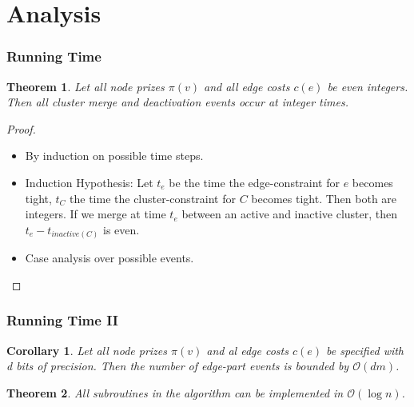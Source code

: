\documentclass[11pt]{beamer}
\newtheorem{theo}{Theorem}
\newtheorem{cor}{Corollary}
\begin{document}
\section{Analysis}

\begin{frame} 
	\frametitle{Running Time}
	\begin{theo}
		Let all node prizes $\pi(v)$ and all edge costs $c(e)$ be even integers. Then all cluster merge and deactivation events occur at integer times.
		\end{theo}
		\pause
		\begin{proof}
			\begin{itemize}
				\item By induction on possible time steps.
				\item Induction Hypothesis: Let $t_e$ be the time the edge-constraint for $e$ becomes tight, $t_C$ the time the cluster-constraint for $C$ becomes tight. Then both are integers. If we merge at time $t_e$ between an active and inactive cluster, then $t_e-t_{inactive(C)}$ is even.
				\item Case analysis over possible events.
			\end{itemize}
		\end{proof}
	\end{frame}
	\begin{frame} 
		\frametitle{Running Time II}
		\begin{cor}
			Let all node prizes $\pi(v)$ and al edge costs $c(e)$ be specified with d bits of precision. Then the number of edge-part events is bounded by $\mathcal{O}(dm)$.
		\end{cor}
			\begin{theo}
				All subroutines in the algorithm can be implemented in $\mathcal{O}(\log n)$.
			\end{theo}
\end{frame}

    \begin{frame} 
    	\nocite{HegdeIndykSchmidt2014}
    	\nocite{Goemans:1992:GAT:139404.139468}
    	
    	
    \end{frame}
\end{document}

